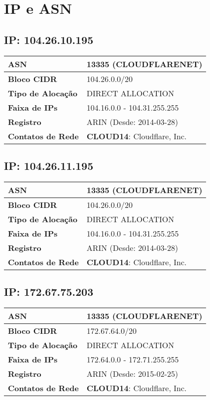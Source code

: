 \section{IP e ASN}

    \subsection{IP: 104.26.10.195}
    \begin{tabular}{|l|l|}
    \hline
    \textbf{ASN} & 13335 (CLOUDFLARENET) \\ \hline
    \textbf{Bloco CIDR} & 104.26.0.0/20 \\ \hline
    \textbf{Tipo de Alocação} & DIRECT ALLOCATION \\ \hline
    \textbf{Faixa de IPs} & 104.16.0.0 - 104.31.255.255 \\ \hline
    \textbf{Registro} & ARIN (Desde: 2014-03-28) \\ \hline
        
\textbf{Contatos de Rede} & \textbf{CLOUD14}: Cloudflare, Inc. 
\\ \hline
\end{tabular}


    \subsection{IP: 104.26.11.195}
    \begin{tabular}{|l|l|}
    \hline
    \textbf{ASN} & 13335 (CLOUDFLARENET) \\ \hline
    \textbf{Bloco CIDR} & 104.26.0.0/20 \\ \hline
    \textbf{Tipo de Alocação} & DIRECT ALLOCATION \\ \hline
    \textbf{Faixa de IPs} & 104.16.0.0 - 104.31.255.255 \\ \hline
    \textbf{Registro} & ARIN (Desde: 2014-03-28) \\ \hline
        
\textbf{Contatos de Rede} & \textbf{CLOUD14}: Cloudflare, Inc. 
\\ \hline
\end{tabular}


    \subsection{IP: 172.67.75.203}
    \begin{tabular}{|l|l|}
    \hline
    \textbf{ASN} & 13335 (CLOUDFLARENET) \\ \hline
    \textbf{Bloco CIDR} & 172.67.64.0/20 \\ \hline
    \textbf{Tipo de Alocação} & DIRECT ALLOCATION \\ \hline
    \textbf{Faixa de IPs} & 172.64.0.0 - 172.71.255.255 \\ \hline
    \textbf{Registro} & ARIN (Desde: 2015-02-25) \\ \hline
        
\textbf{Contatos de Rede} & \textbf{CLOUD14}: Cloudflare, Inc. 
\\ \hline
\end{tabular}


